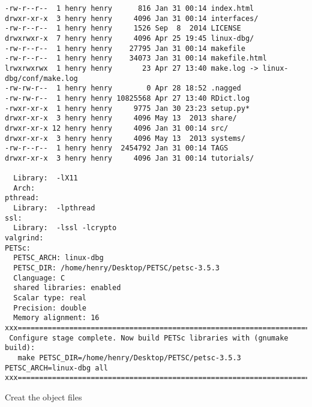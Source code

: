 \documentclass{article}
\begin{document}
\begin{scriptsize}
\begin{verbatim}
-rw-r--r--  1 henry henry      816 Jan 31 00:14 index.html
drwxr-xr-x  3 henry henry     4096 Jan 31 00:14 interfaces/
-rw-r--r--  1 henry henry     1526 Sep  8  2014 LICENSE
drwxrwxr-x  7 henry henry     4096 Apr 25 19:45 linux-dbg/
-rw-r--r--  1 henry henry    27795 Jan 31 00:14 makefile
-rw-r--r--  1 henry henry    34073 Jan 31 00:14 makefile.html
lrwxrwxrwx  1 henry henry       23 Apr 27 13:40 make.log -> linux-dbg/conf/make.log
-rw-rw-r--  1 henry henry        0 Apr 28 18:52 .nagged
-rw-rw-r--  1 henry henry 10825568 Apr 27 13:40 RDict.log
-rwxr-xr-x  1 henry henry     9775 Jan 30 23:23 setup.py*
drwxr-xr-x  3 henry henry     4096 May 13  2013 share/
drwxr-xr-x 12 henry henry     4096 Jan 31 00:14 src/
drwxr-xr-x  3 henry henry     4096 May 13  2013 systems/
-rw-r--r--  1 henry henry  2454792 Jan 31 00:14 TAGS
drwxr-xr-x  3 henry henry     4096 Jan 31 00:14 tutorials/

  Library:  -lX11
  Arch:     
pthread:
  Library:  -lpthread
ssl:
  Library:  -lssl -lcrypto
valgrind:
PETSc:
  PETSC_ARCH: linux-dbg
  PETSC_DIR: /home/henry/Desktop/PETSC/petsc-3.5.3
  Clanguage: C
  shared libraries: enabled
  Scalar type: real
  Precision: double
  Memory alignment: 16
xxx=========================================================================xxx
 Configure stage complete. Now build PETSc libraries with (gnumake build):
   make PETSC_DIR=/home/henry/Desktop/PETSC/petsc-3.5.3 PETSC_ARCH=linux-dbg all
xxx=========================================================================xxx
\end{verbatim}\end{scriptsize}
Creat the object files
\end{document}
